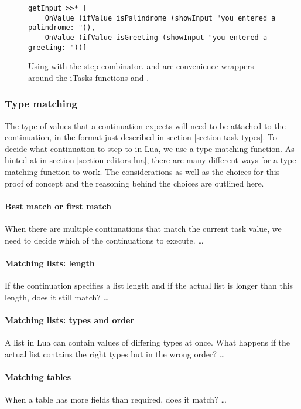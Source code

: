 \begin{figure}[ht]
\centering
\begin{verbatim}
getInput >>* [
	OnValue (ifValue isPalindrome (showInput "you entered a palindrome: ")),
	OnValue (ifValue isGreeting (showInput "you entered a greeting: "))]
\end{verbatim}
\caption{Using  with the step combinator.  and  are convenience wrappers around the iTasks functions  and .}
\label{lst:clean_onvalue_step}
\end{figure}

\subsubsection{Type matching}\label{section-combinators-type-matching}
The type of values that a continuation expects will need to be attached to the continuation, in the format just described in section \ref{section-task-types}. To decide what continuation to step to in Lua, we use a type matching function. As hinted at in section \ref{section-editors-lua}, there are many different ways for a type matching function to work. The considerations as well as the choices for this proof of concept and the reasoning behind the choices are outlined here.

\paragraph{Best match or first match} When there are multiple continuations that match the current task value, we need to decide which of the continuations to execute. \dots

\paragraph{Matching lists: length} If the continuation specifies a list length and if the actual list is longer than this length, does it still match? \dots

\paragraph{Matching lists: types and order} A list in Lua can contain values of differing types at once. What happens if the actual list contains the right types but in the wrong order? \dots

\paragraph{Matching tables} When a table has more fields than required, does it match? \dots


